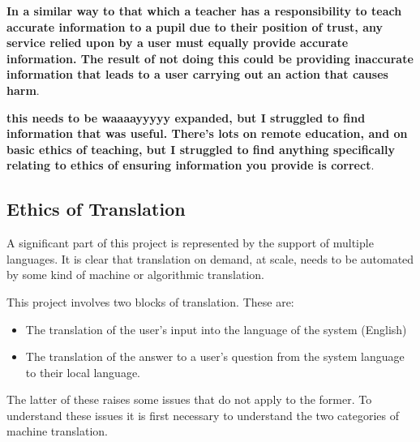 \documentclass[authoryearcitations]{UoYCSproject}
\begin{document}

{\bf In a similar way to that which a teacher has a responsibility to teach accurate information to a pupil due to their position of trust, any service relied upon by a user must equally provide accurate information.  The result of not doing this could be providing inaccurate information that leads to a user carrying out an action that causes harm}.



{\bf this needs to be waaaayyyyy expanded, but I struggled to find information that was useful.  There's lots on remote education, and on basic ethics of teaching, but I struggled to find anything specifically relating to ethics of ensuring information you provide is correct}.


\subsection{Ethics of Translation}
A significant part of this project is represented by the support of multiple languages.  It is clear that translation on demand, at scale, needs to be automated by some kind of machine or algorithmic translation.

This project involves two blocks of translation.  These are:
\begin{itemize}
  \item The translation of the user's input into the language of the system (English)
  \item The translation of the answer to a user's question from the system language to their local language.
\end{itemize}
The latter of these raises some issues that do not apply to the former. To understand these issues it is first necessary to understand the two categories of machine translation.
\end{document}
